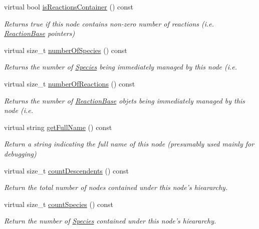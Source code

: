 \begin{DoxyCompactItemize}
virtual bool \hyperlink{classComponent_a506e080028078ef9a753d854c60904a3}{is\+Reactions\+Container} () const 
\begin{DoxyCompactList}\small\item\em Returns true if this node contains non-\/zero number of reactions (i.\+e. \hyperlink{classReactionBase}{Reaction\+Base} pointers) \end{DoxyCompactList}\item 
virtual size\+\_\+t \hyperlink{classComponent_ae99bcb165a9403e64ffea2b840192b4c}{number\+Of\+Species} () const 
\begin{DoxyCompactList}\small\item\em Returns the number of \hyperlink{classSpecies}{Species} being immediately managed by this node (i.\+e. \end{DoxyCompactList}\item 
virtual size\+\_\+t \hyperlink{classComponent_a116a02dd48baa6bf46c1162998548814}{number\+Of\+Reactions} () const 
\begin{DoxyCompactList}\small\item\em Returns the number of \hyperlink{classReactionBase}{Reaction\+Base} objets being immediately managed by this node (i.\+e. \end{DoxyCompactList}\item 
virtual string \hyperlink{classComponent_a42dd891a934150f6d6ef74b9850d4b5c}{get\+Full\+Name} () const 
\begin{DoxyCompactList}\small\item\em Return a string indicating the full name of this node (presumably used mainly for debugging) \end{DoxyCompactList}\item 
virtual size\+\_\+t \hyperlink{classComponent_a38336c92dacb78175dfc7746bde5055d}{count\+Descendents} () const 
\begin{DoxyCompactList}\small\item\em Return the total number of nodes contained under this node's hieararchy. \end{DoxyCompactList}\item 
virtual size\+\_\+t \hyperlink{classComponent_ae4b35cc8ce749e1219bec0eeea16b4bc}{count\+Species} () const 
\begin{DoxyCompactList}\small\item\em Return the number of \hyperlink{classSpecies}{Species} contained under this node's hieararchy. \end{DoxyCompactList}\item 

\end{DoxyCompactItemize}
